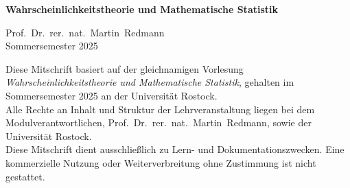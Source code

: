 \documentclass{article}
\begin{document}
\begin{titlepage}
    \centering
    \vspace*{3cm}
    \Large\textbf{Wahrscheinlichkeitstheorie und Mathematische Statistik}

    \vspace{1cm}
    \large
    Prof.\ Dr.\ rer.\ nat.\ Martin\ Redmann\\
    Sommersemester 2025

    \vfill
\end{titlepage}

\tableofcontents

\newpage
\vspace*{2cm}
\begin{center}
    \begin{minipage}{0.85\textwidth}
        \small
        Diese Mitschrift basiert auf der gleichnamigen Vorlesung \textit{Wahrscheinlichkeitstheorie und 
        Mathematische Statistik}, gehalten im Sommersemester 2025 
        an der Universität Rostock.\\[0.5em]
        Alle Rechte an Inhalt und Struktur der Lehrveranstaltung liegen bei dem Modulverantwortlichen, 
        Prof.\ Dr.\ rer.\ nat.\ Martin\ Redmann, sowie der Universität Rostock.\\[0.5em]
        Diese Mitschrift dient ausschließlich zu Lern- und Dokumentationszwecken. Eine kommerzielle Nutzung oder 
        Weiterverbreitung ohne Zustimmung ist nicht gestattet.
    \end{minipage}
\end{center}








\end{document}
